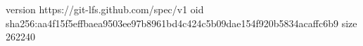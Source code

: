 version https://git-lfs.github.com/spec/v1
oid sha256:aa4f15f5effbaea9503ee97b8961bd4c424c5b09dae154f920b5834acaffc6b9
size 262240
